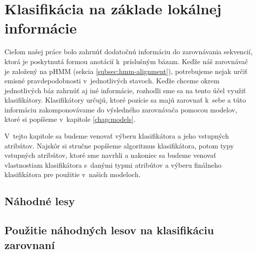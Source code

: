 \chapter[Klasifikácia]{Klasifikácia na základe lokálnej informácie}

Cieľom našej práce bolo zahrnúť dodatočnú informáciu do zarovnávania sekvencií, ktorá je poskytnutá formou anotácií k~príslušným bázam. Keďže náš zarovnávač je založený na pHMM (sekcia \ref{subsec:hmm-alignment}), potrebujeme nejak určiť emisné pravdepodobnosti v~jednotlivých stavoch. Keďže chceme okrem jednotlivých báz zahrnúť aj iné informácie, rozhodli sme sa na tento účel využiť klasifikátory. Klasifikátory určujú, ktoré pozície sa majú zarovnať k~sebe a túto informáciu zakomponovávame do výsledného zarovnávača pomocou modelov, ktoré si popíšeme v~kapitole \ref{chap:models}.

V~tejto kapitole sa budeme venovať výberu klasifikátora a jeho vstupných atribútov. Najskôr si stručne popíšeme algoritmus klasifikátora, potom typy vstupných atribútov, ktoré sme navrhli a nakoniec sa budeme venovať vlastnostiam klasifikátora s~danými typmi atribútov a výberu finálneho klasifikátora pre použitie v~našich modeloch.

\section{Náhodné lesy}


\section[Použitie náh. lesov v~zarovnaní]{Použitie náhodných lesov na klasifikáciu zarovnaní}
\label{sec:use-rf-alignment}

